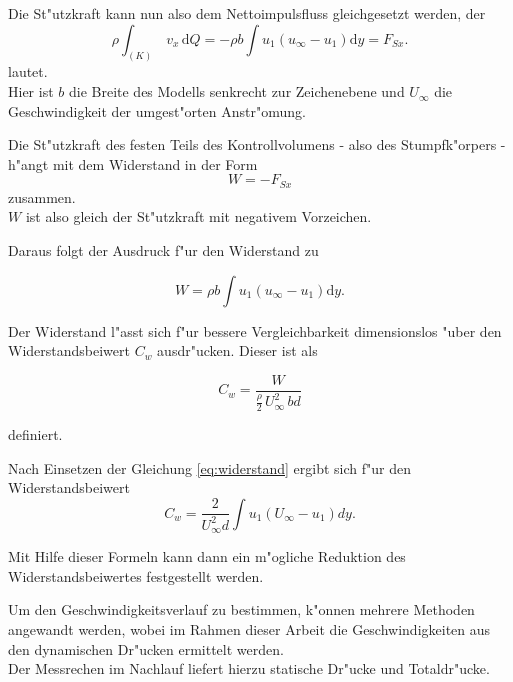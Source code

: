 Die St"utzkraft kann nun also dem Nettoimpulsfluss gleichgesetzt werden, der
\begin{equation}
	\label{eq:nettoimpulsfluss}
	\rho \int_{(K)} \, v_x \, \mathrm{d}Q	= -\rho b \int u_1(u_{\infty} - u_1) \mathrm{d}y = F_{Sx}.	
\end{equation}
lautet.\\
Hier ist $b$ die Breite des Modells senkrecht zur Zeichenebene und $U_{\infty}$ die Geschwindigkeit der umgest"orten Anstr"omung.

Die St"utzkraft des festen Teils des Kontrollvolumens - also des Stumpfk"orpers - h"angt mit dem Widerstand in der Form
\begin{equation}
	\label{eq:W=-F_Sx}
	W = - F_{Sx}
\end{equation}
zusammen.\\
$W$ ist also gleich der St"utzkraft mit negativem Vorzeichen.

Daraus folgt der Ausdruck f"ur den Widerstand zu
\begin{center}
	\begin{equation}
		\label{eq:widerstand}
		W = \rho b \int u_{1} (u_{\infty}- u_{1}) \mathrm{d}y.
	\end{equation}
\end{center}

Der Widerstand l"asst sich f"ur bessere Vergleichbarkeit dimensionslos "uber den Widerstandsbeiwert $C_w$ ausdr"ucken. Dieser ist als 
\begin{center}
	\begin{equation}
		\label{eq:def-c_w}
		C_w = \frac{W}{\frac{\rho}{2}\, U_{\infty}^2 \, bd}
	\end{equation}
\end{center}
definiert.

Nach Einsetzen der Gleichung \ref{eq:widerstand} ergibt sich f"ur den Widerstandsbeiwert
\begin{equation}
	\label{eq:Bestimmungsgleichung C_w}
	C_w = \frac{2}{U_{\infty}^2 d} \int u_{1}(U_{\infty} - u_{1}) dy.
\end{equation}

Mit Hilfe dieser Formeln kann dann ein m"ogliche Reduktion des Widerstandsbeiwertes festgestellt werden.

Um den Geschwindigkeitsverlauf zu bestimmen, k"onnen mehrere Methoden angewandt werden, wobei im Rahmen dieser Arbeit die Geschwindigkeiten aus den dynamischen Dr"ucken ermittelt werden.\\
Der Messrechen im Nachlauf liefert hierzu statische Dr"ucke und Totaldr"ucke.

